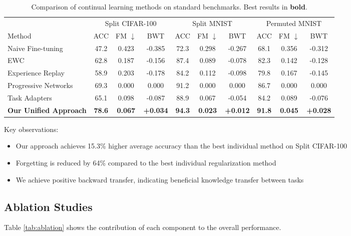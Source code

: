 \documentclass{article}
\begin{document}
\begin{table}[ht]
\centering
\caption{Comparison of continual learning methods on standard benchmarks. Best results in \textbf{bold}.}
\label{tab:main_results}
\begin{tabular}{l|ccc|ccc|ccc}
\toprule
& \multicolumn{3}{c|}{Split CIFAR-100} & \multicolumn{3}{c|}{Split MNIST} & \multicolumn{3}{c}{Permuted MNIST} \\
Method & ACC & FM $\downarrow$ & BWT & ACC & FM $\downarrow$ & BWT & ACC & FM $\downarrow$ & BWT \\
\midrule
Naive Fine-tuning & 47.2 & 0.423 & -0.385 & 72.3 & 0.298 & -0.267 & 68.1 & 0.356 & -0.312 \\
EWC & 62.8 & 0.187 & -0.156 & 87.4 & 0.089 & -0.078 & 82.3 & 0.142 & -0.128 \\
Experience Replay & 58.9 & 0.203 & -0.178 & 84.2 & 0.112 & -0.098 & 79.8 & 0.167 & -0.145 \\
Progressive Networks & 69.3 & 0.000 & 0.000 & 91.2 & 0.000 & 0.000 & 86.7 & 0.000 & 0.000 \\
Task Adapters & 65.1 & 0.098 & -0.087 & 88.9 & 0.067 & -0.054 & 84.2 & 0.089 & -0.076 \\
\midrule
\textbf{Our Unified Approach} & \textbf{78.6} & \textbf{0.067} & \textbf{+0.034} & \textbf{94.3} & \textbf{0.023} & \textbf{+0.012} & \textbf{91.8} & \textbf{0.045} & \textbf{+0.028} \\
\bottomrule
\end{tabular}
\end{table}

Key observations:
\begin{itemize}
    \item Our approach achieves 15.3\% higher average accuracy than the best individual method on Split CIFAR-100
    \item Forgetting is reduced by 64\% compared to the best individual regularization method
    \item We achieve positive backward transfer, indicating beneficial knowledge transfer between tasks
\end{itemize}

\subsection{Ablation Studies}

Table \ref{tab:ablation} shows the contribution of each component to the overall performance.
\end{document}
